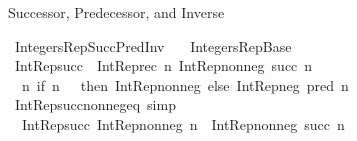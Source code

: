 %
\begin{isabellebody}%
%
%
\begin{isamarkuptext}%
Successor, Predecessor, and Inverse%
\end{isamarkuptext}\isamarkuptrue%
%
\isadelimtheory
%
\endisadelimtheory
%
\isatagtheory
{}\isamarkupfalse%
\ Integers{\isacharunderscore}{\kern0pt}Rep{\isacharunderscore}{\kern0pt}Succ{\isacharunderscore}{\kern0pt}Pred{\isacharunderscore}{\kern0pt}Inv\isanewline
\ \ \ Integers{\isacharunderscore}{\kern0pt}Rep{\isacharunderscore}{\kern0pt}Base\isanewline
{}%
\endisatagtheory
{\isafoldtheory}%
%
\isadelimtheory
%
\endisadelimtheory
\isanewline
\isanewline
{}\isamarkupfalse%
\ {\isachardoublequoteopen}Int{\isacharunderscore}{\kern0pt}Rep{\isacharunderscore}{\kern0pt}succ\ {\isasymequiv}\ Int{\isacharunderscore}{\kern0pt}Rep{\isacharunderscore}{\kern0pt}rec\ {\isacharparenleft}{\kern0pt}{\isasymlambda}n{\isachardot}{\kern0pt}\ Int{\isacharunderscore}{\kern0pt}Rep{\isacharunderscore}{\kern0pt}nonneg\ {\isacharparenleft}{\kern0pt}succ\ n{\isacharparenright}{\kern0pt}{\isacharparenright}{\kern0pt}\isanewline
\ \ {\isacharparenleft}{\kern0pt}{\isasymlambda}n{\isachardot}{\kern0pt}\ {\isacharparenleft}{\kern0pt}if\ n\ {\isacharequal}{\kern0pt}\ {}\ then\ Int{\isacharunderscore}{\kern0pt}Rep{\isacharunderscore}{\kern0pt}nonneg\ else\ Int{\isacharunderscore}{\kern0pt}Rep{\isacharunderscore}{\kern0pt}neg{\isacharparenright}{\kern0pt}\ {\isacharparenleft}{\kern0pt}pred\ n{\isacharparenright}{\kern0pt}{\isacharparenright}{\kern0pt}{\isachardoublequoteclose}\isanewline
\isanewline
{}\isamarkupfalse%
\ Int{\isacharunderscore}{\kern0pt}Rep{\isacharunderscore}{\kern0pt}succ{\isacharunderscore}{\kern0pt}nonneg{\isacharunderscore}{\kern0pt}eq\ {\isacharbrackleft}{\kern0pt}simp{\isacharbrackright}{\kern0pt}{\isacharcolon}{\kern0pt}\isanewline
\ \ {\isachardoublequoteopen}Int{\isacharunderscore}{\kern0pt}Rep{\isacharunderscore}{\kern0pt}succ\ {\isacharparenleft}{\kern0pt}Int{\isacharunderscore}{\kern0pt}Rep{\isacharunderscore}{\kern0pt}nonneg\ n{\isacharparenright}{\kern0pt}\ {\isacharequal}{\kern0pt}\ Int{\isacharunderscore}{\kern0pt}Rep{\isacharunderscore}{\kern0pt}nonneg\ {\isacharparenleft}{\kern0pt}succ\ n{\isacharparenright}{\kern0pt}{\isachardoublequoteclose}\isanewline
%
\isadelimproof
\ \ %
\endisadelimproof

\end{isabellebody}
